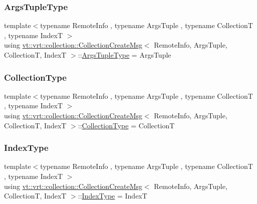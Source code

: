 \subsubsection{\texorpdfstring{Args\+Tuple\+Type}{ArgsTupleType}}
{\footnotesize\ttfamily template$<$typename Remote\+Info , typename Args\+Tuple , typename CollectionT , typename IndexT $>$ \\
using \hyperlink{structvt_1_1vrt_1_1collection_1_1_collection_create_msg}{vt\+::vrt\+::collection\+::\+Collection\+Create\+Msg}$<$ Remote\+Info, Args\+Tuple, CollectionT, IndexT $>$\+::\hyperlink{structvt_1_1vrt_1_1collection_1_1_collection_create_msg_abb55583fc386581742c169c93840744f}{Args\+Tuple\+Type} =  Args\+Tuple}

\mbox{\label{structvt_1_1vrt_1_1collection_1_1_collection_create_msg_a32f39cc924fbbe6f445d48f5b74ded8f}} 
\subsubsection{\texorpdfstring{Collection\+Type}{CollectionType}}
{\footnotesize\ttfamily template$<$typename Remote\+Info , typename Args\+Tuple , typename CollectionT , typename IndexT $>$ \\
using \hyperlink{structvt_1_1vrt_1_1collection_1_1_collection_create_msg}{vt\+::vrt\+::collection\+::\+Collection\+Create\+Msg}$<$ Remote\+Info, Args\+Tuple, CollectionT, IndexT $>$\+::\hyperlink{structvt_1_1vrt_1_1collection_1_1_collection_create_msg_a32f39cc924fbbe6f445d48f5b74ded8f}{Collection\+Type} =  CollectionT}

\mbox{\label{structvt_1_1vrt_1_1collection_1_1_collection_create_msg_a32b4a63169ad3f9063002a91dadb2435}} 
\subsubsection{\texorpdfstring{Index\+Type}{IndexType}}
{\footnotesize\ttfamily template$<$typename Remote\+Info , typename Args\+Tuple , typename CollectionT , typename IndexT $>$ \\
using \hyperlink{structvt_1_1vrt_1_1collection_1_1_collection_create_msg}{vt\+::vrt\+::collection\+::\+Collection\+Create\+Msg}$<$ Remote\+Info, Args\+Tuple, CollectionT, IndexT $>$\+::\hyperlink{structvt_1_1vrt_1_1collection_1_1_collection_create_msg_a32b4a63169ad3f9063002a91dadb2435}{Index\+Type} =  IndexT}

